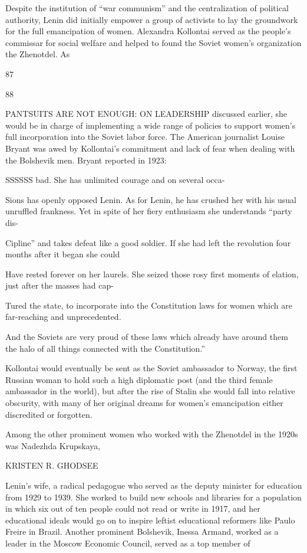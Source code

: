 \par 
Despite the institution of “war communism” and the centralization of political authority, Lenin did initially empower a group of activists to lay the groundwork for the full emancipation of women. Alexandra Kollontai served as the people’s commissar for social welfare and helped to found the Soviet women’s organization the Zhenotdel. As
 \par 
87
 \par 
88
 \par 
PANTSUITS ARE NOT ENOUGH: ON LEADERSHIP discussed earlier, she would be in charge of implementing a wide range of policies to support women’s full incorporation into the Soviet labor force. The American journalist Louise Bryant was awed by Kollontai’s commitment and lack of fear when dealing with the Bolshevik men. Bryant reported in 1923:
 \par 
SSSSSS bad. She has unlimited courage and on several occa-
 \par 
Sions has openly opposed Lenin. As for Lenin, he has crushed her with his usual unruffled frankness. Yet in spite of her fiery enthusiasm she understands “party dis-
 \par 
Cipline” and takes defeat like a good soldier. If she had left the revolution four months after it began she could
 \par 
Have rested forever on her laurels. She seized those rosy first moments of elation, just after the masses had cap-
 \par 
Tured the state, to incorporate into the Constitution laws for women which are far-reaching and unprecedented.
 \par 
And the Soviets are very proud of these laws which already have around them the halo of all things connected with the Constitution.”
 \par 
Kollontai would eventually be sent as the Soviet ambassador to Norway, the first Russian woman to hold such a high diplomatic post (and the third female ambassador in the world), but after the rise of Stalin she would fall into relative obscurity, with many of her original dreams for women’s emancipation either discredited or forgotten.
 \par 
Among the other prominent women who worked with the Zhenotdel in the 1920s was Nadezhda Krupskaya,
 \par 
KRISTEN R. GHODSEE
 \par 
Lenin's wife, a radical pedagogue who served as the deputy minister for education from 1929 to 1939. She worked to build new schools and libraries for a population in which six out of ten people could not read or write in 1917, and her educational ideals would go on to inspire leftist educational reformers like Paulo Freire in Brazil. Another prominent Bolshevik, Inessa Armand, worked as a leader in the Moscow Economic Council, served as a top member of
